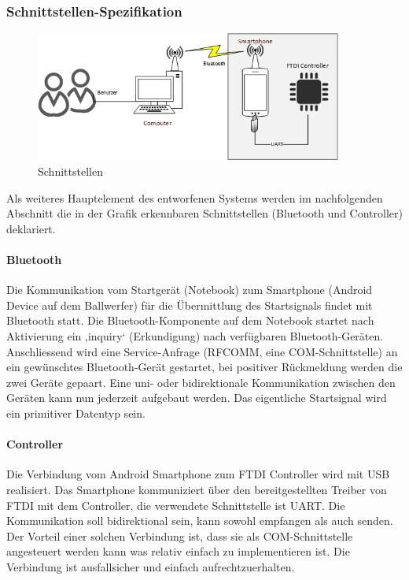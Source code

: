	\subsubsection{Schnittstellen-Spezifikation}
		\begin{figure}[h!]
			\centering
			\includegraphics[width=0.9\textwidth]{Enddokumentation/Loesungskonzept/Bilder/Schnittstellen.jpg}
			\caption{Schnittstellen}		
		\end{figure}
		Als weiteres Hauptelement des entworfenen Systems werden im nachfolgenden Abschnitt die in der Grafik erkennbaren Schnittstellen (Bluetooth und Controller) deklariert.
		
		\paragraph{Bluetooth\\}
		Die Kommunikation vom Startgerät (Notebook) zum Smartphone (Android Device auf dem Ballwerfer) für die Übermittlung des Startsignals findet mit Bluetooth statt. Die Bluetooth-Komponente auf dem Notebook startet nach Aktivierung ein ‚inquiry‘ (Erkundigung) nach verfügbaren Bluetooth-Geräten. Anschliessend wird eine Service-Anfrage (RFCOMM, eine COM-Schnittstelle) an ein gewünschtes Bluetooth-Gerät gestartet, bei positiver Rückmeldung werden die zwei Geräte gepaart. Eine uni- oder bidirektionale Kommunikation zwischen den Geräten kann nun jederzeit aufgebaut werden. Das eigentliche Startsignal wird ein primitiver Datentyp sein.
		
		\paragraph{Controller\\}
		Die Verbindung vom Android Smartphone zum FTDI Controller wird mit USB realisiert. 
		Das Smartphone kommuniziert über den bereitgestellten Treiber von FTDI mit dem Controller, die verwendete Schnittstelle ist UART. Die Kommunikation soll bidirektional sein, kann sowohl empfangen als auch senden. Der Vorteil einer solchen Verbindung ist, dass sie als COM-Schnittstelle angesteuert werden kann was relativ einfach zu implementieren ist. Die Verbindung ist ausfallsicher und einfach aufrechtzuerhalten.		
		
